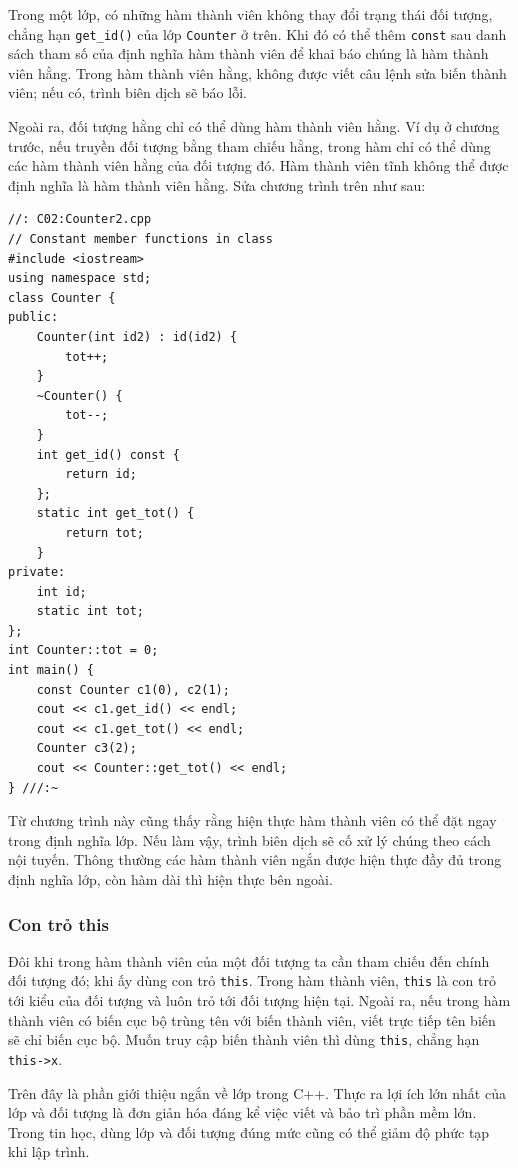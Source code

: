 \documentclass[11pt]{article}
\newcommand{\cpp}{C++}
\begin{document}
Trong một lớp, có những hàm thành viên không thay đổi trạng thái đối tượng,
chẳng hạn \verb|get_id()| của lớp \verb|Counter| ở trên. Khi đó có thể thêm
\verb|const| sau danh sách tham số của định nghĩa hàm thành viên để khai báo
chúng là hàm thành viên hằng. Trong hàm thành viên hằng, không được viết câu
lệnh sửa biến thành viên; nếu có, trình biên dịch sẽ báo lỗi.

Ngoài ra, đối tượng hằng chỉ có thể dùng hàm thành viên hằng. Ví dụ ở chương
trước, nếu truyền đối tượng bằng tham chiếu hằng, trong hàm chỉ có thể dùng
các hàm thành viên hằng của đối tượng đó. Hàm thành viên tĩnh không thể được
định nghĩa là hàm thành viên hằng. Sửa chương trình trên như sau:

\begin{verbatim}
//: C02:Counter2.cpp
// Constant member functions in class
#include <iostream>
using namespace std;
class Counter {
public:
    Counter(int id2) : id(id2) {
        tot++;
    }
    ~Counter() {
        tot--;
    }
    int get_id() const {
        return id;
    };
    static int get_tot() {
        return tot;
    }
private:
    int id;
    static int tot;
};
int Counter::tot = 0;
int main() {
    const Counter c1(0), c2(1);
    cout << c1.get_id() << endl;
    cout << c1.get_tot() << endl;
    Counter c3(2);
    cout << Counter::get_tot() << endl;
} ///:~
\end{verbatim}

Từ chương trình này cũng thấy rằng hiện thực hàm thành viên có thể đặt ngay
trong định nghĩa lớp. Nếu làm vậy, trình biên dịch sẽ cố xử lý chúng theo
cách nội tuyến. Thông thường các hàm thành viên ngắn được hiện thực đầy đủ
trong định nghĩa lớp, còn hàm dài thì hiện thực bên ngoài.

\subsubsection*{Con trỏ this}

Đôi khi trong hàm thành viên của một đối tượng ta cần tham chiếu đến chính
đối tượng đó; khi ấy dùng con trỏ \verb|this|. Trong hàm thành viên,
\verb|this| là con trỏ tới kiểu của đối tượng và luôn trỏ tới đối tượng hiện
tại. Ngoài ra, nếu trong hàm thành viên có biến cục bộ trùng tên với biến
thành viên, viết trực tiếp tên biến sẽ chỉ biến cục bộ. Muốn truy cập biến
thành viên thì dùng \verb|this|, chẳng hạn \verb|this->x|.

Trên đây là phần giới thiệu ngắn về lớp trong \cpp{}. Thực ra lợi ích lớn
nhất của lớp và đối tượng là đơn giản hóa đáng kể việc viết và bảo trì phần
mềm lớn. Trong tin học, dùng lớp và đối tượng đúng mức cũng có thể giảm độ
phức tạp khi lập trình.
\end{document}
